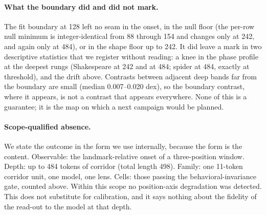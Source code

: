 \documentclass[11pt]{article}
\begin{document}
\paragraph{What the boundary did and did not mark.} The fit boundary at 128 left no seam in the onset, in the null floor (the per-row null minimum is integer-identical from 88 through 154 and changes only at 242, and again only at 484), or in the shape floor up to 242. It did leave a mark in two descriptive statistics that we register without reading: a knee in the phase profile at the deepest rungs (Shakespeare at 242 and at 484; spider at 484, exactly at threshold), and the drift above. Contrasts between adjacent deep bands far from the boundary are small (median 0.007--0.020 dex), so the boundary contrast, where it appears, is not a contrast that appears everywhere. None of this is a guarantee; it is the map on which a next campaign would be planned.

\paragraph{Scope-qualified absence.} We state the outcome in the form we use internally, because the form is the content. Observable: the landmark-relative onset of a three-position window. Depth: up to 484 tokens of corridor (total length 498). Family: one 11-token corridor unit, one model, one lens. Cells: those passing the behavioral-invariance gate, counted above. Within this scope no position-axis degradation was detected. This does not substitute for calibration, and it says nothing about the fidelity of the read-out to the model at that depth.
\end{document}
